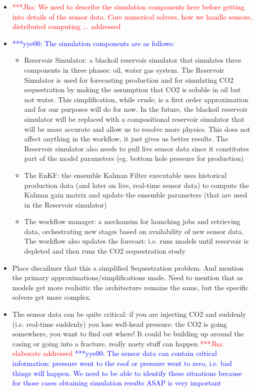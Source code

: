 \documentclass[conference,draft]{IEEEtran}
\newcommand{\jhanote}[1]{ {\textcolor{red} { ***Jha: #1 }}}
\newcommand{\yyenote}[1]{ {\textcolor{blue} { ***yye00: #1 }}}
\newcommand{\jhanote}[1]{}
\newcommand{\yyenote}[1]{}
\begin{document}
\begin{itemize}
\item \jhanote{We need to describe the simulation components here before getting into details of
   the sensor data. Core numerical solvers, how we handle sensors, distributed computing ... addressed}
\item \yyenote{ The simulation components are as follows:}
  \begin{itemize}
    \item Reservoir Simulator: a blackoil reservoir simulator that simulates three components in three phases: oil, water gas system. The Reservoir Simulator is used for forecasting production and for simulating CO2 sequestration by making the assumption that CO2 is soluble in oil but not water. This simplification, while crude, is a first order approximation and for our purposes will do for now. In the future, the blackoil reservoir simulator will be replaced with a compositional reservoir simulator that will be more accurate and allow us to resolve more physics. This does not affect anything in the workflow, it just gives us better results. The Reservoir simulator also needs to pull live sensor data since it constitutes part of the model parameters (eg. bottom hole pressure for production)
    \item The EnKF: the ensemble Kalman Filter executable uses historical production data (and later on live, real-time sensor data) to compute the Kalman gain matrix and update the ensemble parameters (that are used in the Reservoir simulator)
    \item The workflow manager: a mechansim for launching jobs and retrieving data, orchestrating new stages based on availability of new sensor data. The workflow also updates the forecast: i.e. runs models until reservoir is depleted and then runs the CO2 sequestration study
  \end{itemize}


\item Place discailmer that this a simplified Sequestration problem. And mention the primary
 approximations/simplifications made. Need to mention that as models get more realisitic the
architecture remains the same, but the specific solvers get more complex.

\item The sensor data can be quite critical: if you are injecting CO2 and suddenly (i.e. real-time suddenly) you lose well-head pressure: the CO2 is going somewhere, you want to find out where! It could be building up around the casing or going into a fracture, really nasty stuff can happen \jhanote{elaborate  addressed} \yyenote{The sensor data can contain critical information: pressure went to the roof or pressure went to zero, i.e. bad things will happen. We need to be able to identify these situations because for those cases obtaining simulation results ASAP is very important}


\end{itemize}
\end{document}
